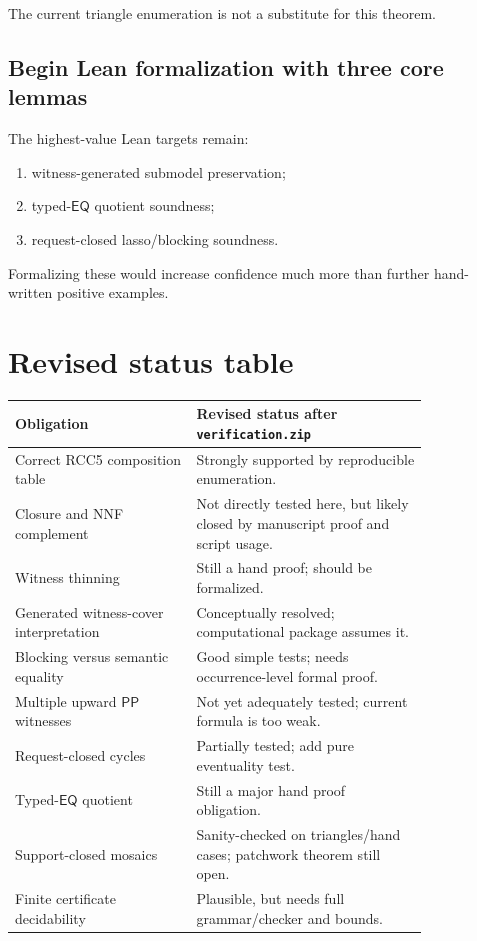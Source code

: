 \documentclass[11pt]{article}
\newcommand{\PP}{\mathsf{PP}}
\newcommand{\EQ}{\mathsf{EQ}}
\begin{document}
The current triangle enumeration is not a substitute for this theorem.

\subsection{Begin Lean formalization with three core lemmas}

The highest-value Lean targets remain:
\begin{enumerate}
\item witness-generated submodel preservation;
\item typed-\(\EQ\) quotient soundness;
\item request-closed lasso/blocking soundness.
\end{enumerate}
Formalizing these would increase confidence much more than further hand-written positive examples.

\section{Revised status table}

\begin{center}
\begin{tabular}{p{0.36\linewidth}p{0.46\linewidth}}
\toprule
Obligation & Revised status after \texttt{verification.zip} \\
\midrule
Correct RCC5 composition table & Strongly supported by reproducible enumeration. \\
Closure and NNF complement & Not directly tested here, but likely closed by manuscript proof and script usage. \\
Witness thinning & Still a hand proof; should be formalized. \\
Generated witness-cover interpretation & Conceptually resolved; computational package assumes it. \\
Blocking versus semantic equality & Good simple tests; needs occurrence-level formal proof. \\
Multiple upward \(\PP\) witnesses & Not yet adequately tested; current formula is too weak. \\
Request-closed cycles & Partially tested; add pure eventuality test. \\
Typed-\(\EQ\) quotient & Still a major hand proof obligation. \\
Support-closed mosaics & Sanity-checked on triangles/hand cases; patchwork theorem still open. \\
Finite certificate decidability & Plausible, but needs full grammar/checker and bounds. \\
\bottomrule
\end{tabular}
\end{center}
\end{document}
